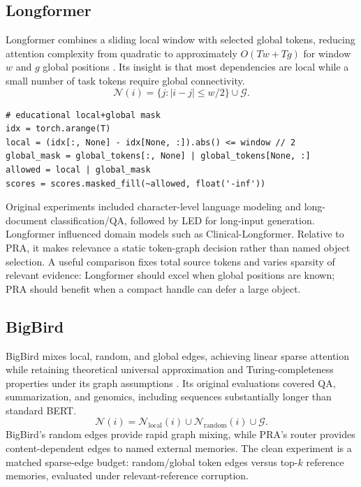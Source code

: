 \documentclass[10pt,a4paper]{article}
\begin{document}
\subsection{Longformer}
Longformer combines a sliding local window with selected global tokens, reducing attention complexity from quadratic to approximately $O(Tw+Tg)$ for window $w$ and $g$ global positions \citep{beltagy2020longformer}. Its insight is that most dependencies are local while a small number of task tokens require global connectivity.
\begin{equation}
\mathcal{N}(i)=\{j:|i-j|\leq w/2\}\cup \mathcal{G}.
\end{equation}
\begin{lstlisting}
# educational local+global mask
idx = torch.arange(T)
local = (idx[:, None] - idx[None, :]).abs() <= window // 2
global_mask = global_tokens[:, None] | global_tokens[None, :]
allowed = local | global_mask
scores = scores.masked_fill(~allowed, float('-inf'))
\end{lstlisting}
Original experiments included character-level language modeling and long-document classification/QA, followed by LED for long-input generation. Longformer influenced domain models such as Clinical-Longformer. Relative to PRA, it makes relevance a static token-graph decision rather than named object selection. A useful comparison fixes total source tokens and varies sparsity of relevant evidence: Longformer should excel when global positions are known; PRA should benefit when a compact handle can defer a large object.

\subsection{BigBird}
BigBird mixes local, random, and global edges, achieving linear sparse attention while retaining theoretical universal approximation and Turing-completeness properties under its graph assumptions \citep{zaheer2020bigbird}. Its original evaluations covered QA, summarization, and genomics, including sequences substantially longer than standard BERT.
\begin{equation}
\mathcal{N}(i)=\mathcal{N}_{\mathrm{local}}(i)\cup\mathcal{N}_{\mathrm{random}}(i)\cup\mathcal{G}.
\end{equation}
BigBird's random edges provide rapid graph mixing, while PRA's router provides content-dependent edges to named external memories. The clean experiment is a matched sparse-edge budget: random/global token edges versus top-$k$ reference memories, evaluated under relevant-reference corruption.
\end{document}

